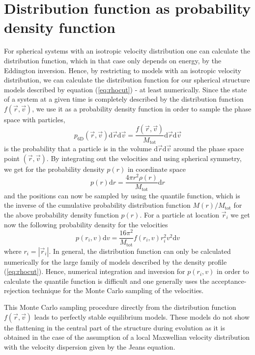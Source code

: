 \documentclass[a4paper,10pt]{article}
\newcommand{\Mtot}{M_{\mathrm{tot}}}
\begin{document}
\section{Distribution function as probability density function}

For spherical systems with an isotropic velocity distribution one can calculate the distribution function, which in that case only depends on energy, by the Eddington inversion. Hence, by restricting to models with an isotropic velocity distribution, we can calculate the distribution function for our spherical structure models described by equation (\ref{eq:rhocut}) - at least numerically. Since the state of a system at a given time is completely described by the distribution function $f(\vec{r},\vec{v})$, we use it as a probability density function in order to sample the phase space with particles,
\begin{equation}
p_{\mathrm{6D}}(\vec{r},\vec{v}) \mathrm{d}\vec{r} \mathrm{d}\vec{v} = \frac{f(\vec{r},\vec{v})}{\Mtot} \mathrm{d}\vec{r} \mathrm{d}\vec{v}
\end{equation}  
is the probability that a particle is in the volume $\mathrm{d}\vec{r} \mathrm{d}\vec{v}$ around the phase space point $(\vec{r},\vec{v})$. By integrating out the velocities and using spherical symmetry, we get for the probability density $p(r)$ in coordinate space
\begin{equation}
p(r) \mathrm{d}r = \frac{4 \pi r^2 \rho(r)}{\Mtot} \mathrm{d}r
\end{equation}
and the positions can now be sampled by using the quantile function, which is the inverse of the cumulative probability distribution function $M(r)/\Mtot$ for the above probability density function $p(r)$. For a particle at location $\vec{r}_i$ we get now the following probability density for the velocities 
\begin{equation}
p(r_i,v) \mathrm{d}v = \frac{16 \pi^2}{\Mtot} f(r_i,v) r_i^2 v^2 \mathrm{d}v
\end{equation}
where $r_i = |\vec{r}_i|$. In general, the distribution function can only be calculated numerically for the large family of models described by the density profile (\ref{eq:rhocut}). Hence, numerical integration and inversion for $p(r_i,v)$ in order to calculate the quantile function is difficult and one generally uses the acceptance-rejection technique for the Monte Carlo sampling of the velocities.

This Monte Carlo sampling procedure directly from the distribution function $f(\vec{r},\vec{v})$ leads to perfectly stable equilibrium models. These models do not show the flattening in the central part of the structure during evolution as it is obtained in the case of the assumption of a local Maxwellian velocity distribution with the velocity dispersion given by the Jeans equation.
\end{document}
